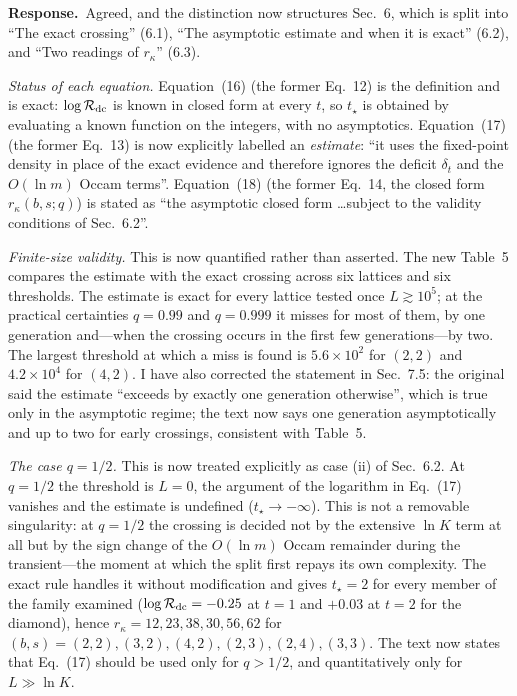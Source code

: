 \documentclass[11pt]{article}
\newcommand{\rk}{r_{\kappa}}
\newcommand{\Rev}{\mathcal{R}}
\newcommand{\logR}{\log \Rev}
\newcommand{\reply}{\par\noindent\textbf{Response.}\ }
\begin{document}
\reply Agreed, and the distinction now structures Sec.~6, which is split into
``The exact crossing'' (6.1), ``The asymptotic estimate and when it is exact''
(6.2), and ``Two readings of $\rk$'' (6.3).

\emph{Status of each equation.} Equation~(16) (the former Eq.~12) is the
definition and is exact: $\logR_{\rm dc}$ is known in closed form at every $t$,
so $t_\star$ is obtained by evaluating a known function on the integers, with
no asymptotics. Equation~(17) (the former Eq.~13) is now explicitly labelled an
\emph{estimate}: ``it uses the fixed-point density in place of the exact
evidence and therefore ignores the deficit $\delta_t$ and the $O(\ln m)$ Occam
terms''. Equation~(18) (the former Eq.~14, the closed form $\rk(b,s;q)$) is
stated as ``the asymptotic closed form \ldots subject to the validity
conditions of Sec.~6.2''.

\emph{Finite-size validity.} This is now quantified rather than asserted. The
new Table~5 compares the estimate with the exact crossing across six lattices
and six thresholds. The estimate is exact for every lattice tested once
$L\gtrsim10^5$; at the practical certainties $q=0.99$ and $q=0.999$ it misses
for most of them, by one generation and---when the crossing occurs in the first
few generations---by two. The largest threshold at which a miss is found is
$5.6\times10^2$ for $(2,2)$ and $4.2\times10^4$ for $(4,2)$. I have also
corrected the statement in Sec.~7.5: the original said the estimate ``exceeds
by exactly one generation otherwise'', which is true only in the asymptotic
regime; the text now says one generation asymptotically and up to two for early
crossings, consistent with Table~5.

\emph{The case $q=1/2$.} This is now treated explicitly as case (ii) of
Sec.~6.2. At $q=1/2$ the threshold is $L=0$, the argument of the logarithm in
Eq.~(17) vanishes and the estimate is undefined ($t_\star\to-\infty$). This is
not a removable singularity: at $q=1/2$ the crossing is decided not by the
extensive $\ln K$ term at all but by the sign change of the $O(\ln m)$ Occam
remainder during the transient---the moment at which the split first repays its
own complexity. The exact rule handles it without modification and gives
$t_\star=2$ for every member of the family examined ($\logR_{\rm dc}=-0.25$ at
$t=1$ and $+0.03$ at $t=2$ for the diamond), hence
$\rk=12,23,38,30,56,62$ for $(b,s)=(2,2),(3,2),(4,2),(2,3),(2,4),(3,3)$. The
text now states that Eq.~(17) should be used only for $q>1/2$, and
quantitatively only for $L\gg\ln K$.
\end{document}
